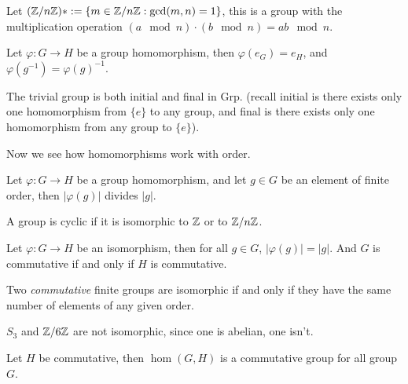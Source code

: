 \begin{defn}
    Let $(\mathbb{Z}/n\mathbb{Z})*:=\{m\in\mathbb{Z}/n\mathbb{Z}: \gcd(m,n)=1\}$, this is a group with the multiplication operation $(a\mod n)\cdot (b\mod n)=ab\mod n$.
\end{defn}
\begin{prop}
    Let $\varphi:G\to H$ be a group homomorphism, then $\varphi(e_G)=e_H$, and $\varphi(g^{-1})=\varphi(g)^{-1}$.
\end{prop}
\begin{prop}
    The trivial group is both initial and final in Grp. (recall initial is there exists only one homomorphism from $\{e\}$ to any group, and final is there exists only one homomorphism from any group to $\{e\}$).
\end{prop}
Now we see how homomorphisms work with order.

\begin{prop}
    Let $\varphi: G\to H$ be a group homomorphism, and let $g\in G$ be an element of finite order, then $|\varphi(g)|$ divides $|g|$.
\end{prop}
\begin{defn}[cyclic]
    A group is cyclic if it is isomorphic to $\mathbb{Z}$ or to $\mathbb{Z}/n\mathbb{Z}$.
\end{defn}
\begin{prop}
    Let $\varphi:G\to H$ be an isomorphism, then for all $g\in G$, $|\varphi(g)|=|g|$. And $G$ is commutative if and only if $H$ is commutative.
\end{prop}
\begin{thm}
    Two \textit{commutative} finite groups are isomorphic if and only if they have the same number of elements of any given order.
\end{thm}
\begin{example}
    $S_3$ and $\mathbb{Z}/6\mathbb{Z}$ are not isomorphic, since one is abelian, one isn't.
\end{example}
\begin{defn}
    Let $H$ be commutative, then $\hom(G,H)$ is a commutative group for all group $G$.
\end{defn}


